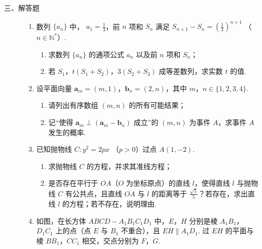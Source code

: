 \begin{description}

    \item[三、解答题]

    \begin{enumerate}[leftmargin=5pt]

      \addtocounter{enumi}{+16}

        \item 数列 \( \{a_{n}\} \) 中， \( a_{1}=\frac{1}{3} \)，前 \(n\) 项和 \( S_{n} \) 满足 \( S_{n+1}-S_{n}=\left(\frac{1}{3}\right)^{n+1} \) （\(n\in\mathbb{N}^{*}\)）.

\begin{enumerate}
\item 求数列 \( \{a_{n}\} \) 的通项公式 \( a_{n} \) 以及前 \(n\) 项和 \( S_{n} \)；
\item 若 \(S_{1}\)，\(t\left(S_{1}+S_{2}\right)\)，\(3\left(S_{2}+S_{3}\right)\) 成等差数列，求实数 \(t\) 的值.
\end{enumerate}

        \item 设平面向量 \(\bm{a}_{m} = (m,1)\)，\(\bm{b}_{n} = (2,n)\)，其中 \(m\)，\(n \in \{1,2,3,4\}\).

\begin{enumerate}
\item 请列出有序数组 \(\left(m,n\right)\) 的所有可能结果；
\item 记“使得 \(\bm{a}_{m} \perp \left(\bm{a}_{m}-\bm{b}_{n}\right)\) 成立”的 \(\left(m,n\right)\) 为事件 \(A\)，求事件 \(A\) 发生的概率.
\end{enumerate}

        \item 已知抛物线 \(C: y^{2}=2px\) （\(p>0\)）过点 \(A\left(1,-2\right)\).

\begin{enumerate}
\item 求抛物线 \(C\) 的方程，并求其准线方程；
\item 是否存在平行于 \(OA\)（\(O\) 为坐标原点）的直线 \(l\)，使得直线 \(l\) 与抛物线 \(C\) 有公共点，且直线 \(OA\) 与 \(l\) 的距离等于 \(\frac{\sqrt{5}}{5}\)？若存在，求出直线 \(l\) 的方程；若不存在，说明理由.
\end{enumerate}

        \item 如图，在长方体 \(ABCD-A_{1}B_{1}C_{1}D_{1}\) 中，\(E\)，\(H\) 分别是棱 \(A_{1}B_{1}\)，\(D_{1}C_{1}\) 上的点（点 \(E\) 与 \(B_{1}\) 不重合），且 \(EH\parallel A_{1}D_{1}\). 过 \(EH\) 的平面与棱 \(BB_{1}\)，\(CC_{1}\) 相交，交点分别为 \(F\)，\(G\).


\end{enumerate}
\end{description}
